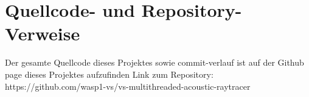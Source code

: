 \section{Quellcode- und Repository-Verweise}
\label{quellcode}

Der gesamte Quellcode dieses Projektes sowie commit-verlauf ist auf der Github page dieses Projektes aufzufinden
Link zum Repository:\\ https://github.com/wasp1-vs/vs-multithreaded-acoustic-raytracer